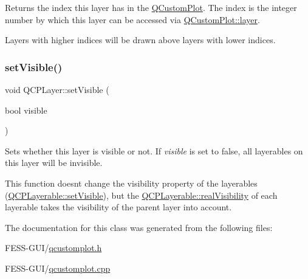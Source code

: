 Returns the index this layer has in the \hyperlink{class_q_custom_plot}{Q\+Custom\+Plot}. The index is the integer number by which this layer can be accessed via \hyperlink{class_q_custom_plot_a0a96244e7773b242ef23c32b7bdfb159}{Q\+Custom\+Plot\+::layer}.

Layers with higher indices will be drawn above layers with lower indices. \hypertarget{class_q_c_p_layer_ac07671f74edf6884b51a82afb2c19516}{}\label{class_q_c_p_layer_ac07671f74edf6884b51a82afb2c19516} 
\subsubsection{\texorpdfstring{set\+Visible()}{setVisible()}}
{\footnotesize\ttfamily void Q\+C\+P\+Layer\+::set\+Visible (\begin{DoxyParamCaption}\item[{bool}]{visible }\end{DoxyParamCaption})}

Sets whether this layer is visible or not. If {\itshape visible} is set to false, all layerables on this layer will be invisible.

This function doesn\textquotesingle{}t change the visibility property of the layerables (\hyperlink{class_q_c_p_layerable_a3bed99ddc396b48ce3ebfdc0418744f8}{Q\+C\+P\+Layerable\+::set\+Visible}), but the \hyperlink{class_q_c_p_layerable_ab054e88f15d485defcb95e7376f119e7}{Q\+C\+P\+Layerable\+::real\+Visibility} of each layerable takes the visibility of the parent layer into account. 

The documentation for this class was generated from the following files\+:\begin{DoxyCompactItemize}
\item 
F\+E\+S\+S-\/\+G\+U\+I/\hyperlink{qcustomplot_8h}{qcustomplot.\+h}\item 
F\+E\+S\+S-\/\+G\+U\+I/\hyperlink{qcustomplot_8cpp}{qcustomplot.\+cpp}\end{DoxyCompactItemize}
